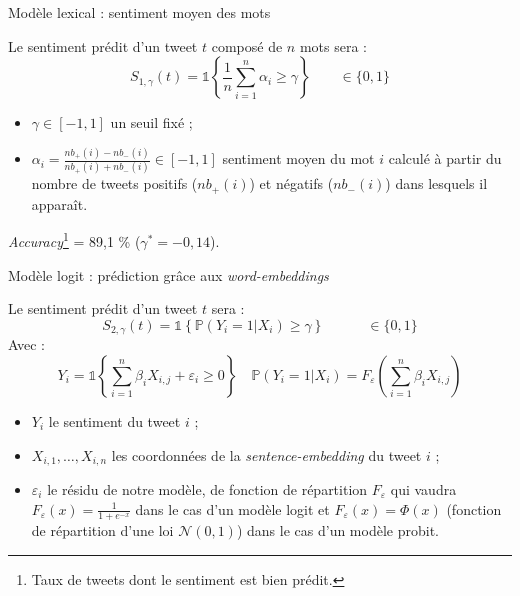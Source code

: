 \documentclass[10pt,xcolor=table,color={dvipsnames,usenames},ignorenonframetext,usepdftitle=false,french]{beamer}
\begin{document}
\begin{frame}{Modèle lexical : sentiment moyen des mots}
\protect\hypertarget{moduxe8le-lexical-sentiment-moyen-des-mots}{}

Le sentiment prédit d'un tweet \(t\) composé de \(n\) mots sera :
\[S_{1,\gamma}(t) = \mathds{1}\left\{ \frac{1}{n} \sum \limits_{i=1}^n \alpha_i \geq \gamma\right\}  \qquad \in \{ 0,1 \}\]

\begin{itemize}
\item $\gamma \in [-1,1]$ un seuil fixé ;
\item $\alpha_i = \frac{nb_+(i) - nb_-(i)}{nb_+(i) + nb_-(i)} \in [-1,1]$  sentiment moyen du mot $i$ calculé à partir du nombre de tweets positifs ($nb_+(i)$) et négatifs ($nb_-(i)$) dans lesquels il apparaît. 
\end{itemize}

\faArrowCircleRight{}
\emph{Accuracy}\footnote{Taux de tweets dont le sentiment est bien prédit.}
= 89,1 \% (\(\gamma^* = -0,14\)).

\end{frame}

\begin{frame}{Modèle logit : prédiction grâce aux
\emph{word-embeddings}}
\protect\hypertarget{moduxe8le-logit-pruxe9diction-gruxe2ce-aux-word-embeddings}{}

Le sentiment prédit d'un tweet \(t\) sera :
\[S_{2,\gamma}(t) =\mathds{1}\left\{   \mathbb{P}(Y_i = 1 | X_{i}) \ge \gamma\right\} \qquad \quad \in \{ 0,1 \}\]
Avec :
\[Y_i = \mathds{1}\left\{ \sum_{i = 1}^n \beta_i X_{i,j} + \varepsilon_i \geq 0 \right\} \quad  \mathbb{P}(Y_i = 1 | X_{i}) = F_{\varepsilon}\left(\sum_{i = 1}^n \beta_i X_{i,j}\right)\]

\normalsize
\begin{itemize}
\item $Y_i$ le sentiment du tweet $i$ ;
\item $X_{i,1}, \dots, X_{i,n}$ les coordonnées de la \emph{sentence-embedding} du tweet $i$ ;
\item $\varepsilon_i$ le résidu de notre modèle, de fonction de répartition $F_{\varepsilon}$ qui vaudra $F_{\varepsilon}(x) = \frac{1}{1 + e^{-x}}$ dans le cas d'un modèle logit et $F_{\varepsilon}(x) = \Phi(x)$ (fonction de répartition d'une loi $\mathcal{N}(0, 1)$) dans le cas d'un modèle probit. 
\end{itemize}

\end{frame}
\end{document}
